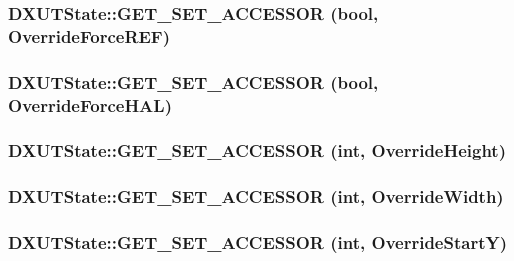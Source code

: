 \label{class_d_x_u_t_state_af946c3e5a8cd41dc434c5d3fe5e970de}
\hypertarget{class_d_x_u_t_state_a8b63ee5a944b457d0c4eeae69f93a2a4}{
\subsubsection[{GET\_\-SET\_\-ACCESSOR}]{\setlength{\rightskip}{0pt plus 5cm}DXUTState::GET\_\-SET\_\-ACCESSOR (bool, \/  OverrideForceREF)}}
\label{class_d_x_u_t_state_a8b63ee5a944b457d0c4eeae69f93a2a4}
\hypertarget{class_d_x_u_t_state_a9a895506bdec9cae22f98d4a2da91cb1}{
\subsubsection[{GET\_\-SET\_\-ACCESSOR}]{\setlength{\rightskip}{0pt plus 5cm}DXUTState::GET\_\-SET\_\-ACCESSOR (bool, \/  OverrideForceHAL)}}
\label{class_d_x_u_t_state_a9a895506bdec9cae22f98d4a2da91cb1}
\hypertarget{class_d_x_u_t_state_a5a9501d43f90b05494198179316d41da}{
\subsubsection[{GET\_\-SET\_\-ACCESSOR}]{\setlength{\rightskip}{0pt plus 5cm}DXUTState::GET\_\-SET\_\-ACCESSOR ({\bf int}, \/  OverrideHeight)}}
\label{class_d_x_u_t_state_a5a9501d43f90b05494198179316d41da}
\hypertarget{class_d_x_u_t_state_a9dbeab9d6c151fa2b0d3d71311939640}{
\subsubsection[{GET\_\-SET\_\-ACCESSOR}]{\setlength{\rightskip}{0pt plus 5cm}DXUTState::GET\_\-SET\_\-ACCESSOR ({\bf int}, \/  OverrideWidth)}}
\label{class_d_x_u_t_state_a9dbeab9d6c151fa2b0d3d71311939640}
\hypertarget{class_d_x_u_t_state_ad98c1abb28d4379b55f0f4ffb3191f29}{
\subsubsection[{GET\_\-SET\_\-ACCESSOR}]{\setlength{\rightskip}{0pt plus 5cm}DXUTState::GET\_\-SET\_\-ACCESSOR ({\bf int}, \/  OverrideStartY)}}
